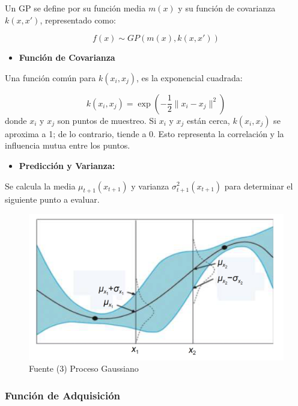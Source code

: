 \documentclass[
  12pt,
  letterpaper,
  DIV=11,
  numbers=noendperiod]{scrartcl}
\providecommand{\tightlist}{%
  \setlength{\itemsep}{0pt}\setlength{\parskip}{0pt}}\usepackage{longtable,booktabs,array}
\begin{document}
Un GP se define por su función media \(m(x)\) y su función de covarianza
\(k(x, x')\), representado como:

\[
f(x) \sim GP(m(x), k(x, x'))
\]

\newpage

\begin{itemize}
\tightlist
\item
  \textbf{Función de Covarianza}
\end{itemize}

Una función común para \(k(x_i, x_j)\), es la exponencial cuadrada:

\[
k(x_i, x_j) = \exp\left(-\frac{1}{2} \|x_i - x_j\|^2\right)
\] donde \(x_i\) y \(x_j\) son puntos de muestreo. Si \(x_i\) y \(x_j\)
están cerca, \(k(x_i, x_j)\) se aproxima a 1; de lo contrario, tiende a
0. Esto representa la correlación y la influencia mutua entre los
puntos.

\begin{itemize}
\tightlist
\item
  \textbf{Predicción y Varianza:}
\end{itemize}

Se calcula la media \(\mu_{t+1}(x_{t+1})\) y varianza
\(\sigma^2_{t+1}(x_{t+1})\) para determinar el siguiente punto a
evaluar.

\begin{figure}[H]

{\centering \includegraphics{imgs/Proceso_Gaussiano_1Dim.png}

}

\caption{Fuente (3) Proceso Gaussiano}

\end{figure}%

\subsubsection{Función de
Adquisición}\label{funciuxf3n-de-adquisiciuxf3n}
\end{document}
